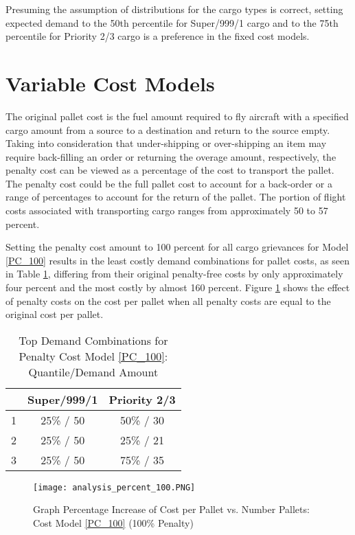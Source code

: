  Presuming the assumption of distributions for the cargo types is correct, setting expected demand to the 50th percentile for Super/999/1 cargo and to the 75th percentile for Priority 2/3 cargo is a preference in the fixed cost models. 
\section{Variable Cost Models}
The original pallet cost is the fuel amount required to fly aircraft with a specified cargo amount from a source to a destination and return to the source empty. Taking into consideration that under-shipping or over-shipping an item may require back-filling an order or returning the overage amount, respectively, the penalty cost can be viewed as a percentage of the cost to transport the pallet. The penalty cost could be the full pallet cost to account for a back-order or a range of percentages to account for the return of the pallet. The portion of flight costs associated with transporting cargo ranges from approximately 50 to 57 percent.\par
Setting the penalty cost amount to 100 percent for all cargo grievances for Model\label{PC_100} \ref{PC_100} results in the least costly demand combinations for pallet costs, as seen in Table \ref{table_top3_PC100}, differing from their original penalty-free costs by only approximately four percent and the most costly by almost 160 percent. Figure \ref{fig_GraphNoPriorityCost} shows the effect of penalty costs on the cost per pallet when all penalty costs are equal to the original cost per pallet.  
\begin{table}[H]
    \centering
    \caption{Top Demand Combinations for Penalty Cost Model \ref{PC_100}: Quantile/Demand Amount}
    \label{table_top3_PC100}
    \begin{tabular}{@{}lcc@{}}
    \toprule
        & Super/999/1 & Priority 2/3 \\ \midrule
        1 & 25\% / 50 & 50\% / 30 \\
        2 & 25\% / 50 & 25\% / 21 \\
        3 & 25\% / 50 & 75\% / 35 \\ \bottomrule
    \end{tabular}
\end{table}

\begin{figure}[H]
\centering
\texttt{[image: analysis\_percent\_100.PNG]}
\caption{Graph Percentage Increase of Cost per Pallet vs. Number Pallets: Cost Model \ref{PC_100} (100\% Penalty)}
\label{fig_GraphNoPriorityCost}
\end{figure}

